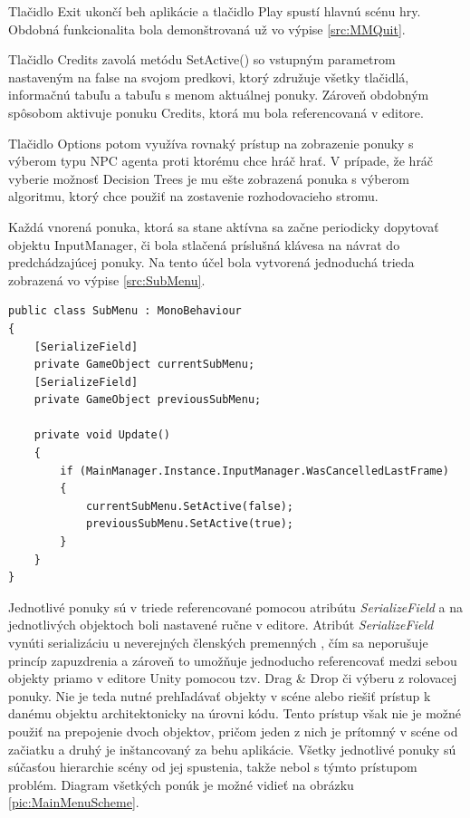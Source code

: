 \documentclass[slovak, master]{diploma}
\begin{document}
Tlačidlo Exit ukončí beh aplikácie a tlačidlo Play spustí hlavnú scénu hry. Obdobná funkcionalita bola demonštrovaná už vo výpise \ref{src:MMQuit}.

Tlačidlo Credits zavolá metódu SetActive() so vstupným parametrom nastaveným na false na svojom predkovi, ktorý združuje všetky tlačidlá, informačnú tabuľu a tabuľu s menom aktuálnej ponuky. Zároveň obdobným spôsobom aktivuje ponuku Credits, ktorá mu bola referencovaná v editore. 

Tlačidlo Options potom využíva rovnaký prístup na zobrazenie ponuky s výberom typu NPC agenta proti ktorému chce hráč hrať. V prípade, že hráč vyberie možnosť Decision Trees je mu ešte zobrazená ponuka s výberom algoritmu, ktorý chce použiť na zostavenie rozhodovacieho stromu.

Každá vnorená ponuka, ktorá sa stane aktívna sa začne periodicky dopytovať objektu InputManager, či bola stlačená príslušná klávesa na návrat do predchádzajúcej ponuky. Na tento účel bola vytvorená jednoduchá trieda zobrazená vo výpise \ref{src:SubMenu}.

\vspace{8pt}
\begin{lstlisting}[label=src:SubMenu,caption={Trieda SubMenu reprezentujúca vnorenú ponuku}]
public class SubMenu : MonoBehaviour
{
    [SerializeField]
    private GameObject currentSubMenu;
    [SerializeField]
    private GameObject previousSubMenu;

    private void Update()
    {
        if (MainManager.Instance.InputManager.WasCancelledLastFrame)
        {
            currentSubMenu.SetActive(false);
            previousSubMenu.SetActive(true);
        }
    }
}
\end{lstlisting}

Jednotlivé ponuky sú v triede referencované pomocou atribútu \textit{SerializeField} a na jednotlivých objektoch boli nastavené ručne v editore. Atribút \textit{SerializeField} vynúti serializáciu u neverejných členských premenných \cite{SerializeField}, čím sa neporušuje princíp zapuzdrenia a zároveň to umožňuje jednoducho referencovať medzi sebou objekty priamo v editore Unity pomocou tzv. Drag \& Drop či výberu z rolovacej ponuky. Nie je teda nutné prehľadávať objekty v scéne alebo riešiť prístup k danému objektu architektonicky na úrovni kódu. Tento prístup však nie je možné použiť na prepojenie dvoch objektov, pričom jeden z nich je prítomný v scéne od začiatku a druhý je inštancovaný za behu aplikácie. Všetky jednotlivé ponuky sú súčasťou hierarchie scény od jej spustenia, takže nebol s týmto prístupom problém. Diagram všetkých ponúk je možné vidieť na obrázku \ref{pic:MainMenuScheme}.
\end{document}

